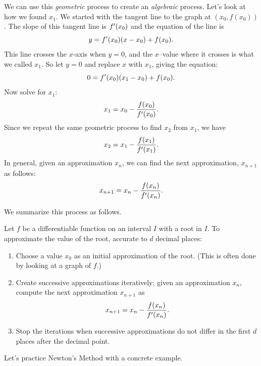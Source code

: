 We can use this \textit{geometric} process to create an \textit{algebraic} process.  Let's look at how we found $x_1$.  We started with the tangent line to the graph at $(x_0,f(x_0))$.  The slope of this tangent line is $f'(x_0)$ and the equation of the line is
$$y=f'(x_0)(x-x_0)+f(x_0).$$
This line crosses the $x$-axis when $y=0$, and the $x$--value where it crosses is what we called $x_1$. So let $y=0$ and replace $x$ with $x_1$, giving the equation: 
$$ 0 = f'(x_0)(x_1-x_0)+f(x_0).$$ 
Now solve for $x_1$:
$$x_1=x_0-\frac{f(x_0)}{f'(x_0)}.$$
Since we repeat the same geometric process to find $x_2$ from $x_1$, we have
$$x_2=x_1-\frac{f(x_1)}{f'(x_1)}.$$
In general, given an approximation $x_n$, we can find the next approximation, $x_{n+1}$ as follows:
$$x_{n+1} = x_{n} - \frac{f(x_{n})}{f'(x_{n})}.$$

We summarize this process as follows.

{Let $f$ be a differentiable function on an interval $I$ with a root in $I$. To approximate the value of the root, accurate to $d$ decimal places:
\begin{enumerate}
\item Choose a value $x_0$ as an initial approximation of the root. (This is often done by looking at a graph of $f$.)
\item	 Create successive approximations iteratively; given an approximation $x_n$, compute the next approximation $x_{n+1}$ as $$x_{n+1} = x_n - \frac{f(x_n)}{f'(x_n)}.$$
\item Stop the iterations when successive approximations do not differ in the first $d$ places after the decimal point.
\end{enumerate}
} %


Let's practice Newton's Method with a concrete example.


